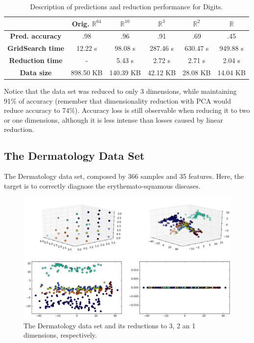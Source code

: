 \documentclass[12pt]{report}
\begin{document}
\begin{table}[H]
	\centering
	\begin{tabular}{|c|c|c|c|c|c|}
		\hline
		& \textbf{Orig. $\mathbb{R}^{64}$} & \textbf{$\mathbb{R}^{10}$} & \textbf{$\mathbb{R}^3$} & \textbf{$\mathbb{R}^2$} & \textbf{$\mathbb{R}$} \\\hline
		\textbf{Pred. accuracy}   & .98 & .96 & .91 & .69 & .45 \\\hline
		\textbf{GridSearch time} & 12.22 s & 98.08 s & 287.46 s & 630.47 s & 949.88 s \\\hline
		\textbf{Reduction time}  & - & 5.43 s & 2.72 s & 2.71 s & 2.04 s \\\hline
		\textbf{Data size} & 898.50 KB & 140.39 KB & 42.12 KB & 28.08 KB & 14.04 KB \\\hline
	\end{tabular}

	\caption{Description of predictions and reduction performance for Digits.}
\end{table}

Notice that the data set was reduced to only 3 dimensions, while maintaining 91\% of accuracy (remember that dimensionality reduction with PCA would reduce accuracy to 74\%). Accuracy loss is still observable when reducing it to two or one dimensions, although it is less intense than losses caused by linear reduction.

\newpage
\subsection{The Dermatology Data Set}

The Dermatology data set, composed by 366 samples and 35 features. Here, the target is to correctly diagnose the erythemato-squamous diseases.

\begin{figure}[H]
	\centering
	\includegraphics[width=\linewidth]{experiments/iso_dermatology}
	\captionsetup{justification=centering}
	\caption{The Dermatology data set and its reductions to 3, 2 an 1 dimensions, respectively.}
\end{figure}
\end{document}

